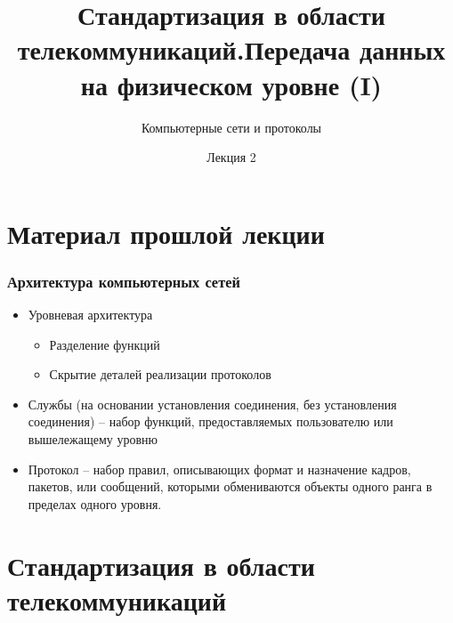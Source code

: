 \documentclass[utf8]{beamer}
\title{Стандартизация в области телекоммуникаций.\newline Передача данных на физическом уровне (I)}
\author {Компьютерные сети и протоколы}
\date{Лекция 2}
\begin{document}
\begin{frame}
\titlepage
\end{frame}
\section{Материал прошлой лекции}
\begin{frame}
\frametitle{Архитектура компьютерных сетей}
\begin{itemize}
 \item Уровневая архитектура
 \begin{itemize}
    \item Разделение функций
    \item Скрытие деталей реализации протоколов
 \end{itemize}
 \item Службы (на основании установления соединения, без установления соединения) -- набор функций, предоставляемых пользователю или вышележащему уровню
 \item Протокол -- набор правил, описывающих формат и назначение кадров, пакетов, или сообщений, которыми обмениваются объекты одного ранга в пределах одного уровня.
\end{itemize}
\end{frame}
\section{Стандартизация в области телекоммуникаций}
\end{document}
